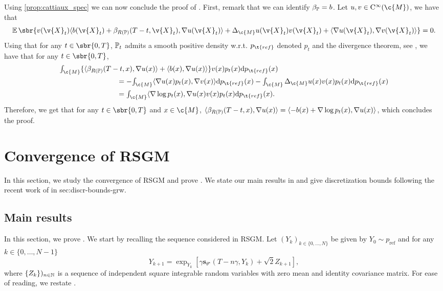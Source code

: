 Using \cref{prop:cattiaux_spec} we can now conclude the proof of .
First, remark that we can identify $\beta_{\bb{P}} = b$.
Let $u, v \in \mathrm{C}^\infty(\c{M})$, we have that \begin{equation} \label{eq:equality_fin} \E\sbr{v(\v{X}_t) \langle b(\v{X}_t) + \beta_{R(\bb{P})}(T-t, \v{X}_t), \nabla u(\v{X}_t) \rangle + \Delta_\c{M} u(\v{X}_t) v(\v{X}_t)+ \langle \nabla u(\v{X}_t) , \nabla v(\v{X}_t) \rangle } = 0 .
\end{equation}
Using that for any $t \in \sbr{0,T}$, $\bb{P}_t$ admits a smooth positive density w.r.t.
$p_{\t{ref}}$ denoted $p_t$ and the divergence theorem, see \parencite[p.51]{lee2018introduction}, we have that for any $t \in \sbr{0,T}$, \begin{align}   & \textstyle{\int_{\c{M}} \{ \langle \beta_{R(\bb{P})}(T-t, x), \nabla u(x) \rangle + \langle b(x), \nabla u(x) \rangle \} v(x) p_t(x) \mathrm{d} p_{\t{ref}}(x)} \\ & \qquad \qquad \qquad \qquad = - \textstyle{\int_\c{M} \langle \nabla u(x) p_t(x), \nabla v(x) \rangle \mathrm{d} p_{\t{ref}}(x) - \int_\c{M} \Delta_\c{M} u (x) v(x) p_t(x) \mathrm{d} p_{\t{ref}}(x) } \\ & \qquad \qquad \qquad \qquad = \textstyle{\int_\c{M} \langle \nabla \log p_t(x), \nabla u(x) v(x) p_t(x)\mathrm{d} p_{\t{ref}}(x) } .
\end{align}
Therefore, we get that for any $t \in \sbr{0,T}$ and $x \in \c{M}$, $\langle \beta_{R(\bb{P})}(T-t, x), \nabla u(x) \rangle = \langle -b(x) + \nabla\log p_t(x), \nabla u(x) \rangle$, which concludes the proof.

\section{Convergence of RSGM}
\label{sec:convergence-rsgm}

In this section, we study the convergence of RSGM and prove .
We state our main results in  and give discretization bounds following the recent work of \textcite{cheng2022theorymanifold} in {sec:discr-bounds-grw}.

\subsection{Main results}
\label{sec:main-results}

In this section, we prove .
We start by recalling the sequence considered in RSGM.
Let $(Y_k)_{k \in \{0, \dots, N\}}$ be given by $Y_0 \sim p_{\mathrm{ref}}$ and for any $k \in \{0, \dots, N-1\}$ \begin{equation} Y_{k+1} = \exp_{Y_k}[\gamma \mathbf{s}_{\theta^\star}(T - n\gamma, Y_k) + \sqrt{2} Z_{k+1}] , \end{equation} where $\{Z_k\})_{n \in \mathbb{N}}$ is a sequence of independent square integrable random variables with zero mean and identity covariance matrix.
For ease of reading, we restate .

